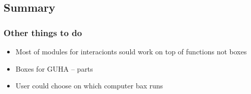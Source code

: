 \documentclass{beamer}
\begin{document}
\subsection{Summary}
\begin{frame}
	\frametitle{Other things to do}
	\begin{block}{}
		\begin{itemize}[<+->]
			\item Most of modules for interacionts sould work on top of functions not boxes
			\item Boxes for GUHA -- parts 
			\item User could choose on which computer bax runs
		\end{itemize}
	\end{block}
\end{frame}
\end{document}
